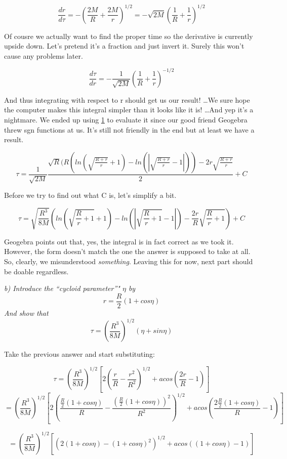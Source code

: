 \documentclass[landscape,letterpaper,10pt,english]{article}
\begin{document}
\[ \frac{dr}{d\tau} = -\left( \frac{2M}{R} + \frac{2M}{r} \right)^{1/2} = -\sqrt{2M}\left( \frac{1}{R} + \frac{1}{r} \right)^{1/2} \]

    Of cousre we actually want to find the proper time so the derivative is
currently upside down. Let's pretend it's a fraction and just invert it.
Surely this won't cause any problems later.

\[ \frac{d\tau}{dr} = -\frac{1}{\sqrt{2M}}\left( \frac{1}{R} + \frac{1}{r} \right)^{-1/2} \]

And thus integrating with respect to r should get us our result!
\ldots We sure hope the computer makes this integral simpler than it
looks like it is! \ldots And yep it's a nightmare. We ended up using
\hyperref[1]{1} to evaluate it since our good friend Geogebra threw sgn
functions at us. It's still not friendly in the end but at least we have
a result.

    \[ \tau = \frac{1}{\sqrt{2M}}\frac{\sqrt{R}(R(ln(\sqrt{\frac{R+r}{r}}+1) - ln(|\sqrt{\frac{R+r}{r}}-1|))-2r\sqrt{\frac{R+r}{r}}}{2} + C   \]

Before we try to find out what C is, let's simplify a bit.

    \[ \tau = \sqrt{\frac{R^3}{8M}}\left( ln(\sqrt{\frac{R}{r}+1}+1) - ln(|\sqrt{\frac{R}{r}+1}-1|)-\frac{2r}{R}\sqrt{\frac{R}{r}+1} \right) + C   \]

    Geogebra points out that, yes, the integral is in fact correct as we
took it. However, the form doesn't match the one the answer is supposed
to take at all. So, clearly, we misunderstood \emph{something}. Leaving
this for now, next part should be doable regardless.

    \emph{b) Introduce the ``cycloid parameter''" \(\eta\) by}
\[ r = \frac{R}{2}(1+cos\eta) \] \emph{And show that}
\[ \tau = \left( \frac{R^3}{8M} \right)^{1/2} (\eta + sin\eta) \]

    Take the previous answer and start substituting:

\[ \tau = \left( \frac{R^3}{8M} \right)^{1/2} \left[ 2 \left( \frac{r}{R} - \frac{r^2}{R^2} \right)^{1/2} + acos \left( \frac{2r}{R} - 1 \right) \right] \]
\[ = \left( \frac{R^3}{8M} \right)^{1/2} \left[ 2 \left( \frac{\frac{R}{2}(1+cos\eta)}{R} - \frac{(\frac{R}{2}(1+cos\eta))^2}{R^2} \right)^{1/2} + acos \left( \frac{2\frac{R}{2}(1+cos\eta)}{R} - 1 \right) \right] \]

    \[ = \left( \frac{R^3}{8M} \right)^{1/2} \left[ \left( 2(1+cos\eta) - (1+cos\eta)^2\right)^{1/2} + acos \left( (1+cos\eta) - 1 \right) \right] \]
\end{document}
